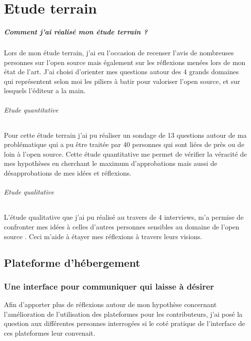 \chapter{Etude terrain} %

	\paragraph{Comment j'ai réalisé mon étude terrain ? \\}

		Lors de mon étude terrain, j'ai eu l'occasion de recenser l'avis de nombreuses personnes sur l'open source mais également sur les réflexions menées lors de mon état de l'art.
		J'ai choisi d'orienter mes questions autour des 4 grands domaines qui représentent selon moi les piliers à batir pour valoriser l'open source, et sur lesquels l'éditeur a la main.

		\subparagraph{Etude quantitative \\}

		Pour cette étude terrain j'ai pu réaliser un sondage de 13 questions autour de ma problématique qui a pu être traitée par 40 personnes qui sont liées de près ou de loin à l'open source. Cette étude quantitative me permet de vérifier la véracité de mes hypothèses en cherchant le maximum d'approbations mais aussi de désapprobations de mes idées et réflexions.

		\subparagraph{Etude qualitative \\}

		L'étude qualitative que j'ai pu réalisé au travers de 4 interviews, m'a permise de confronter mes idées à celles d'autres personnes sensibles au domaine de l'open source . Ceci m'aide à étayer mes réflexions à travers leurs visions.

	\section{Plateforme d'hébergement}

		\subsection{Une interface pour communiquer qui laisse à désirer}

			Afin d'apporter plus de réflexions autour de mon hypothèse concernant l'amélioration de l'utilisation des plateformes pour les contributeurs, j'ai posé la question aux différentes personnes interrogées si le coté pratique de l'interface de ces plateformes leur convenait.\\

